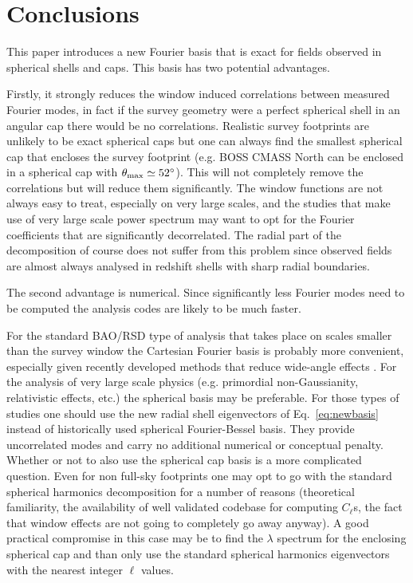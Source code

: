 \documentclass[fleqn,usenatbib]{mnras}
\begin{document}
\section{Conclusions}
\label{sec:conclusions}

This paper introduces a new Fourier basis that is exact for fields observed in
spherical shells and caps. This basis has two potential advantages. 

Firstly, it strongly reduces the window induced correlations between measured
Fourier modes, in fact if the survey geometry were a perfect spherical shell in
an angular cap there would be no correlations. Realistic survey footprints are
unlikely to be exact spherical caps but one can always find the smallest
spherical cap that encloses the survey footprint (e.g. BOSS CMASS North can be
enclosed in a spherical cap with $\theta_\mathrm{max} \simeq 52\degree$). This
will not completely remove the correlations but will reduce them significantly.
The window functions are not always easy to treat, especially on very large
scales, and the studies that make use of very large scale power spectrum may
want to opt for the Fourier coefficients that are significantly decorrelated.
The radial part of the decomposition of course does not suffer from this
problem since observed fields are almost always analysed in redshift shells
with sharp radial boundaries.

The second advantage is numerical. Since significantly less Fourier modes need
to be computed the analysis codes are likely to be much faster.

For the standard BAO/RSD type of analysis that takes place on scales smaller
than the survey window the Cartesian Fourier basis is probably more convenient,
especially given recently developed methods that reduce wide-angle effects
\citep{2015MNRAS.453L..11B,2015PhRvD..92h3532S}. For the analysis of very large
scale physics (e.g. primordial non-Gaussianity, relativistic effects, etc.) the
spherical basis may be preferable. For those types of studies one should use
the new radial shell eigenvectors of Eq.~\eqref{eq:newbasis} instead of
historically used spherical Fourier-Bessel basis.  They provide uncorrelated
modes and carry no additional numerical or conceptual penalty. Whether or not
to also use the spherical cap basis is a more complicated question. Even for non
full-sky footprints one may opt to go with the standard spherical harmonics
decomposition for a number of reasons (theoretical familiarity, the
availability of well validated codebase for computing $C_\ell$s, the fact that window
effects are not going to completely go away anyway). A good practical
compromise in this case may be to find the $\lambda$ spectrum for the enclosing
spherical cap and than only use the standard spherical harmonics eigenvectors
with the nearest integer $\ell$ values.
\end{document}
